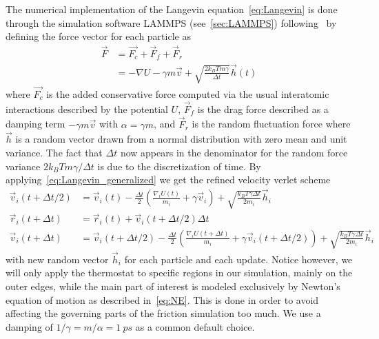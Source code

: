 The numerical implementation of the Langevin equation~\cref{eq:Langevin} is done through the simulation software LAMMPS (see~\cref{sec:LAMMPS}) following~\cite{PhysRevB.17.1302} by defining the force vector for each particle as 
\begin{align}
  \vec{F} &= \vec{F_c} + \vec{F}_{f} + \vec{F}_{r} \nonumber \\
  &= -\nabla U - \gamma m \vec{v} + \sqrt{\frac{2 k_B T m \gamma}{\Delta t}}\vec{h}(t)
  \label{eq:Langevin_generalized}
\end{align}
where $\vec{F_c}$ is the added conservative force computed via the usual
interatomic interactions described by the potential $U$, $\vec{F}_f$ is the
drag force described as a damping term $-\gamma m \vec{v}$ with $\alpha = \gamma m$, and $\vec{F}_r$ is the random fluctuation force where $\vec{h}$ is a random vector drawn from a normal distribution with zero mean and unit variance. The fact that $\Delta t$ now appears in the denominator for the random force variance $2k_B T m \gamma / \Delta t$ is due to the discretization of time. By applying~\cref{eq:Langevin_generalized} we get the refined velocity verlet scheme
\begin{align*}
  \vec{v}_i(t + \Delta t/2)  &= \vec{v}_i(t) - \frac{\Delta t}{2}\left(\frac{\nabla_i U(t)}{m_i} + \gamma \vec{v}_i \right) + \sqrt{\frac{k_B T \gamma \Delta t}{2m_i}} \vec{h}_i \\ 
  \vec{r}_i(t + \Delta t) &= \vec{r}_i(t) + \vec{v}_i(t + \Delta t/2) \Delta t \\
  \vec{v}_i(t + \Delta t) &= \vec{v}_i(t+ \Delta t/2) - \frac{\Delta t}{2}\left(\frac{\nabla_i U(t + \Delta t)}{m_i} + \gamma \vec{v}_i(t + \Delta t/2) \right) + \sqrt{\frac{k_B T \gamma \Delta t}{2m_i}} \vec{h}_i
\end{align*}
with new random vector $\vec{h}_i$ for each particle and each update. Notice
however, we will only apply the thermostat to specific regions in our simulation, mainly on the outer edges, while the main part of interest is modeled exclusively by Newton's equation of motion as described in~\cref{eq:NE}. This is done in order to avoid affecting the governing parts of the friction simulation too much. We use a damping of $1/\gamma = m/\alpha = \SI{1}{ps}$ as a common default choice. 




